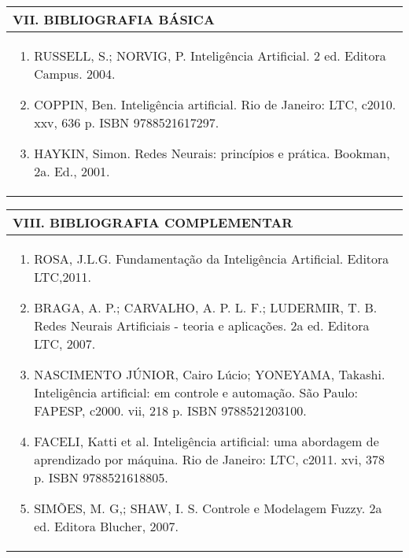 \documentclass[12pt]{article}
\begin{document}
\newpage

\begin{longtable}{|L{1.025\textwidth}|} \hline
%
{\bf VII. BIBLIOGRAFIA BÁSICA} \\ \hline
\begin{enumerate}
%
\item RUSSELL, S.; NORVIG, P. Inteligência Artificial. 2 ed. Editora Campus. 2004. 
\item COPPIN, Ben. Inteligência artificial. Rio de Janeiro: LTC, c2010. xxv, 636 p. ISBN 9788521617297.
\item HAYKIN, Simon. Redes Neurais: princípios e prática. Bookman, 2a. Ed., 2001.

\end{enumerate}
 \\ \hline
\end{longtable}



\begin{longtable}{|L{1.025\textwidth}|} \hline
%
{\bf VIII. BIBLIOGRAFIA COMPLEMENTAR} \\ \hline
\begin{enumerate}
\item  ROSA, J.L.G. Fundamentação da Inteligência Artificial. Editora LTC,2011. 
\item BRAGA, A. P.; CARVALHO, A. P. L. F.; LUDERMIR, T. B. Redes Neurais Artificiais - teoria e aplicações. 2a ed. Editora LTC, 2007. 
\item NASCIMENTO JÚNIOR, Cairo Lúcio; YONEYAMA, Takashi. Inteligência artificial: em controle e automação. São Paulo: FAPESP, c2000. vii, 218 p. ISBN 9788521203100.
\item FACELI, Katti et al. Inteligência artificial: uma abordagem de aprendizado por máquina. Rio de Janeiro: LTC, c2011. xvi, 378 p. ISBN 9788521618805.
\item SIMÕES, M. G,; SHAW, I. S. Controle e Modelagem Fuzzy. 2a ed. Editora Blucher, 2007.

\end{enumerate}
 \\ \hline
\end{longtable}



\end{document}
